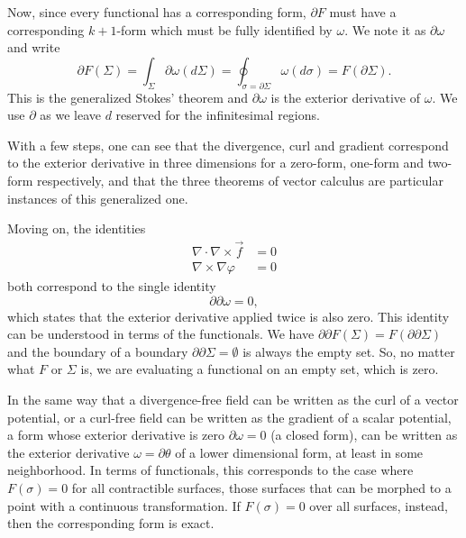 \documentclass[10pt,twocolumn, nofootinbib]{revtex4-2}
\begin{document}
Now, since every functional has a corresponding form, $\partial F$ must have a corresponding $k+1$-form which must be fully identified by $\omega$. We note it as $\partial \omega$ and write
\begin{equation*}
	\partial F(\Sigma) = \int_\Sigma \partial \omega(d\Sigma) = \oint_{\sigma = \partial \Sigma} \omega(d\sigma) = F(\partial \Sigma).
\end{equation*}
This is the generalized Stokes' theorem and $\partial \omega$ is the exterior derivative of $\omega$. We use $\partial$ as we leave $d$ reserved for the infinitesimal regions.

With a few steps, one can see that the divergence, curl and gradient correspond to the exterior derivative in three dimensions for a zero-form, one-form and two-form respectively, and that the three theorems of vector calculus are particular instances of this generalized one.

Moving on, the identities
\begin{equation*}
	\begin{aligned}
		\nabla \cdot \nabla \times \vec{f} &= 0 \\
		\nabla \times \nabla \varphi &= 0
	\end{aligned}
\end{equation*}
both correspond to the single identity
\begin{equation*}
	\partial \partial \omega = 0,
\end{equation*}
which states that the exterior derivative applied twice is also zero. This identity can be understood in terms of the functionals. We have  $\partial \partial F(\Sigma) = F(\partial \partial \Sigma)$ and the boundary of a boundary $\partial \partial \Sigma = \emptyset$ is always the empty set. So, no matter what $F$ or $\Sigma$ is, we are evaluating a functional on an empty set, which is zero.

In the same way that a divergence-free field can be written as the curl of a vector potential, or a curl-free field can be written as the gradient of a scalar potential, a form whose exterior derivative is zero $\partial \omega = 0$ (a closed form), can be written as the exterior derivative $\omega = \partial \theta$ of a lower dimensional form, at least in some neighborhood. In terms of functionals, this corresponds to the case where $F(\sigma)=0$ for all contractible surfaces, those surfaces that can be morphed to a point with a continuous transformation. If $F(\sigma)=0$ over all surfaces, instead, then the corresponding form is exact. 
\end{document}
